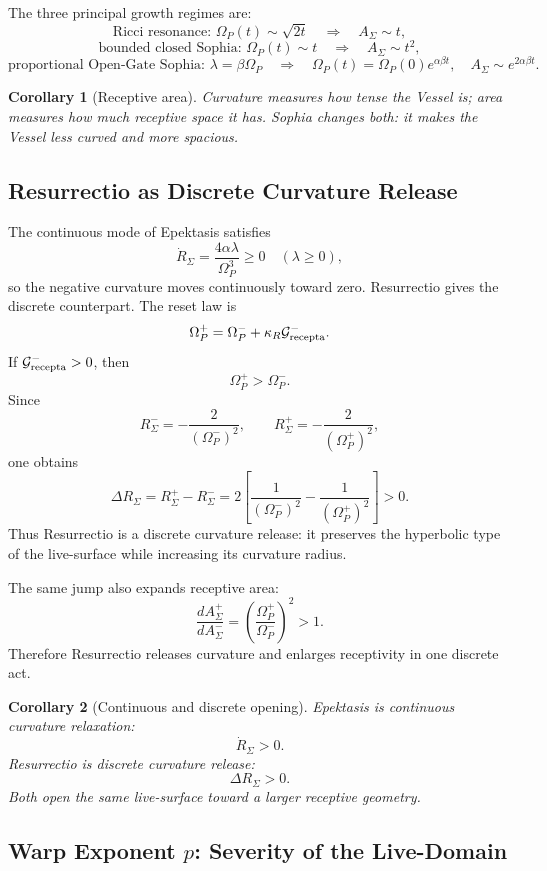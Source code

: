 \documentclass[11pt,a4paper]{article}
\newcommand{\Op}{\Omega_P}
\newcommand{\Grec}{\mathcal{G}_{\rm recepta}}
\theoremstyle{plain}
\newtheorem{corollary}{Corollary}
\theoremstyle{remark}
\theoremstyle{definition}
\begin{document}
The three principal growth regimes are:
\[
\text{Ricci resonance: }\Op(t)\sim\sqrt{2t}
\quad\Longrightarrow\quad
A_\Sigma\sim t,
\]
\[
\text{bounded closed Sophia: }\Op(t)\sim t
\quad\Longrightarrow\quad
A_\Sigma\sim t^2,
\]
\[
\text{proportional Open-Gate Sophia: }\lambda=\beta\Op
\quad\Longrightarrow\quad
\Op(t)=\Op(0)e^{\alpha\beta t},
\quad
A_\Sigma\sim e^{2\alpha\beta t}.
\]

\begin{corollary}[Receptive area]
Curvature measures how tense the Vessel is; area measures how much receptive space it has. Sophia
changes both: it makes the Vessel less curved and more spacious.
\end{corollary}

\subsection{Resurrectio as Discrete Curvature Release}\label{sec:discrete-release}

The continuous mode of Epektasis satisfies
\[
\dot R_\Sigma=\frac{4\alpha\lambda}{\Op^3}\ge0
\quad(\lambda\ge0),
\]
so the negative curvature moves continuously toward zero. Resurrectio gives the discrete counterpart.
The reset law is
\[
\Op^+=\Op^-+\kappa_R\Grec^-.
\]
If \(\Grec^->0\), then
\[
\Op^+>\Op^-.
\]
Since
\[
R_\Sigma^-= -\frac{2}{(\Op^-)^2},
\qquad
R_\Sigma^+= -\frac{2}{(\Op^+)^2},
\]
one obtains
\[
\boxed{\Delta R_\Sigma=R_\Sigma^+-R_\Sigma^-
=
2\left[\frac{1}{(\Op^-)^2}-\frac{1}{(\Op^+)^2}\right]>0.}
\]
Thus Resurrectio is a discrete curvature release: it preserves the hyperbolic type of the live-surface
while increasing its curvature radius.

The same jump also expands receptive area:
\[
\frac{dA_\Sigma^+}{dA_\Sigma^-}
=
\left(\frac{\Op^+}{\Op^-}\right)^2>1.
\]
Therefore Resurrectio releases curvature and enlarges receptivity in one discrete act.

\begin{corollary}[Continuous and discrete opening]
Epektasis is continuous curvature relaxation:
\[
\dot R_\Sigma>0.
\]
Resurrectio is discrete curvature release:
\[
\Delta R_\Sigma>0.
\]
Both open the same live-surface toward a larger receptive geometry.
\end{corollary}

\subsection{Warp Exponent \texorpdfstring{$p$}{p}: Severity of the Live-Domain}\label{sec:warp-p}
\end{document}
